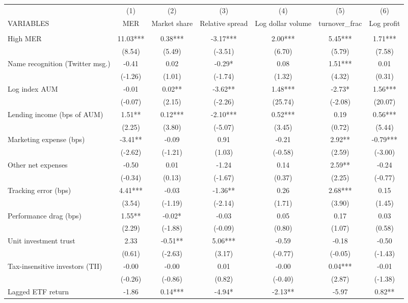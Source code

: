 \documentclass[]{article}
\begin{document}
\begin{tabular}{lcccccc} \hline
 & (1) & (2) & (3) & (4) & (5) & (6) \\
VARIABLES & MER & Market share & Relative spread & Log dollar volume & turnover\_frac & Log profit \\ \hline
 &  &  &  &  &  &  \\
High MER & 11.03*** & 0.38*** & -3.17*** & 2.00*** & 5.45*** & 1.71*** \\
 & (8.54) & (5.49) & (-3.51) & (6.70) & (5.79) & (7.58) \\
Name recognition (Twitter msg.) & -0.41 & 0.02 & -0.29* & 0.08 & 1.51*** & 0.01 \\
 & (-1.26) & (1.01) & (-1.74) & (1.32) & (4.32) & (0.31) \\
Log index AUM & -0.01 & 0.02** & -3.62** & 1.48*** & -2.73* & 1.56*** \\
 & (-0.07) & (2.15) & (-2.26) & (25.74) & (-2.08) & (20.07) \\
Lending income (bps of AUM) & 1.51** & 0.12*** & -2.10*** & 0.52*** & 0.19 & 0.56*** \\
 & (2.25) & (3.80) & (-5.07) & (3.45) & (0.72) & (5.44) \\
Marketing expense (bps) & -3.41** & -0.09 & 0.91 & -0.21 & 2.92** & -0.79*** \\
 & (-2.62) & (-1.21) & (1.03) & (-0.58) & (2.59) & (-3.00) \\
Other net expenses & -0.50 & 0.01 & -1.24 & 0.14 & 2.59** & -0.24 \\
 & (-0.34) & (0.13) & (-1.67) & (0.37) & (2.25) & (-0.77) \\
Tracking error (bps) & 4.41*** & -0.03 & -1.36** & 0.26 & 2.68*** & 0.15 \\
 & (3.54) & (-1.19) & (-2.14) & (1.71) & (3.90) & (1.45) \\
Performance drag (bps) & 1.55** & -0.02* & -0.03 & 0.05 & 0.17 & 0.03 \\
 & (2.29) & (-1.88) & (-0.09) & (0.80) & (1.07) & (0.58) \\
Unit investment trust & 2.33 & -0.51** & 5.06*** & -0.59 & -0.18 & -0.50 \\
 & (0.61) & (-2.63) & (3.17) & (-0.77) & (-0.05) & (-1.43) \\
Tax-insensitive investors (TII) & -0.00 & -0.00 & 0.01 & -0.00 & 0.04*** & -0.01 \\
 & (-0.26) & (-0.86) & (0.82) & (-0.40) & (2.87) & (-1.38) \\
Lagged ETF return & -1.86 & 0.14*** & -4.94* & -2.13** & -5.97 & 0.82** \\

\end{tabular}
\end{document}
